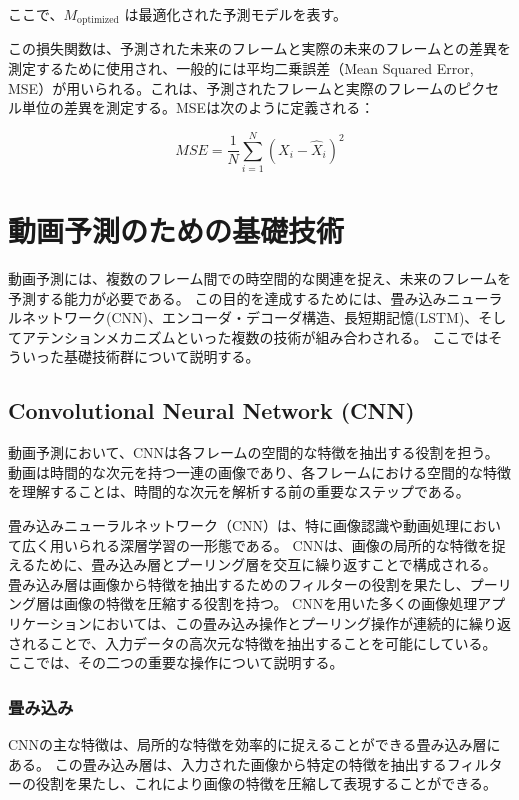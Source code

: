     ここで、\( M_{\text{optimized}} \) は最適化された予測モデルを表す。

    この損失関数は、予測された未来のフレームと実際の未来のフレームとの差異を測定するために使用され、一般的には平均二乗誤差（Mean Squared Error, MSE）が用いられる。これは、予測されたフレームと実際のフレームのピクセル単位の差異を測定する。MSEは次のように定義される：

    \begin{equation}
    MSE = \frac{1}{N} \sum_{i=1}^{N} (X_i - \hat{X}_i)^2
    \end{equation}

  \section{動画予測のための基礎技術}
    動画予測には、複数のフレーム間での時空間的な関連を捉え、未来のフレームを予測する能力が必要である。
    この目的を達成するためには、畳み込みニューラルネットワーク(CNN)、エンコーダ・デコーダ構造、長短期記憶(LSTM)、そしてアテンションメカニズムといった複数の技術が組み合わされる。
    ここではそういった基礎技術群について説明する。

    \subsection{Convolutional Neural Network (CNN)}
      動画予測において、CNNは各フレームの空間的な特徴を抽出する役割を担う。
      動画は時間的な次元を持つ一連の画像であり、各フレームにおける空間的な特徴を理解することは、時間的な次元を解析する前の重要なステップである。

      畳み込みニューラルネットワーク（CNN）は、特に画像認識や動画処理において広く用いられる深層学習の一形態である。
      CNNは、画像の局所的な特徴を捉えるために、畳み込み層とプーリング層を交互に繰り返すことで構成される。
      畳み込み層は画像から特徴を抽出するためのフィルターの役割を果たし、プーリング層は画像の特徴を圧縮する役割を持つ。
      CNNを用いた多くの画像処理アプリケーションにおいては、この畳み込み操作とプーリング操作が連続的に繰り返されることで、入力データの高次元な特徴を抽出することを可能にしている。
      ここでは、その二つの重要な操作について説明する。
    
      \subsubsection{畳み込み}
        CNNの主な特徴は、局所的な特徴を効率的に捉えることができる畳み込み層にある。
        この畳み込み層は、入力された画像から特定の特徴を抽出するフィルターの役割を果たし、これにより画像の特徴を圧縮して表現することができる。
        

